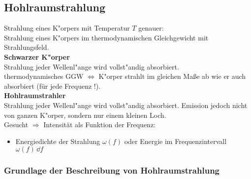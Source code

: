 
\subsection{Hohlraumstrahlung}

Strahlung eines K"orpers mit Temperatur $T$ genauer:\\[5pt]
Strahlung eines K"orpers im thermodynamischen Gleichgewicht mit Strahlungsfeld.\\[5pt]
\textbf{Schwarzer K"orper}\\
Strahlung jeder Wellenl"ange wird vollst"andig absorbiert.\\
thermodynamisches GGW $\Leftrightarrow$ K"orper strahlt im gleichen Maße ab wie er auch absorbiert (für jede Frequenz !). \\[5pt]
\textbf{Hohlraumstrahler}\\
Strahlung jeder Wellenl"ange wird vollst"andig absorbiert. Emission jedoch nicht von ganzen K"orper, sondern nur einem kleinen Loch.\\[5pt]
Gesucht $ \Rightarrow $ Intensität als Funktion der Frequenz:
\begin{itemize}
	\item Energiedichte der Strahlung $ \omega(f) $ oder Energie im Frequenzintervall $ \omega(f) \, \dd f $
\end{itemize}

\subsubsection{Grundlage der Beschreibung von Hohlraumstrahlung}

